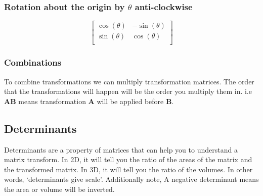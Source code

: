 \documentclass[12pt] {article}
\begin{document}
\subsubsection*{Rotation about the origin by $\theta$ anti-clockwise}
\begin{equation*}
  \begin{bmatrix}
    \cos(\theta) & -\sin(\theta) \\
    \sin(\theta) & \cos(\theta) \\
  \end{bmatrix}
\end{equation*}

\subsubsection*{Combinations}
To combine transformations we can multiply transformation matrices. The order that the 
transformations will happen will be the order you multiply them in. i.e $\textbf{A}\textbf{B}$
means transformation \textbf{A} will be applied before \textbf{B}.

\subsection*{Determinants}
Determinants are a property of matrices that can help you to understand a matrix transform.
In 2D, it will tell you the ratio of the areas of the matrix and the transformed matrix.
In 3D, it will tell you the ratio of the volumes. 
In other words, `determinants give scale'.
Additionally note, A negative determinant means the area or volume will be inverted.
\end{document}
